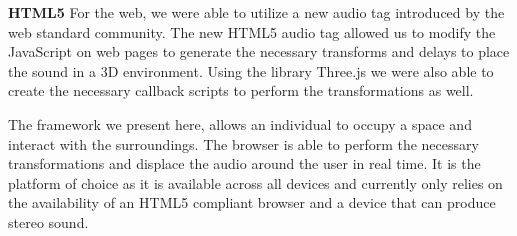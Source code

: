 \textbf{HTML5} For the web, we were able to utilize a new audio tag introduced
by the web standard community.  The new HTML5 audio tag allowed us to modify the
JavaScript on web pages to generate the necessary transforms and delays to
place the sound in a 3D environment.  Using the library Three.js we were also
able to create the necessary callback scripts to perform the transformations as
well.

The framework we present here, allows an individual to occupy a space and
interact with the surroundings.  The browser is able to perform the necessary
transformations and displace the audio around the user in real time. It is the
platform of choice as it is available across all devices and currently only
relies on the availability of an HTML5 compliant browser and a device that
can produce stereo sound.
